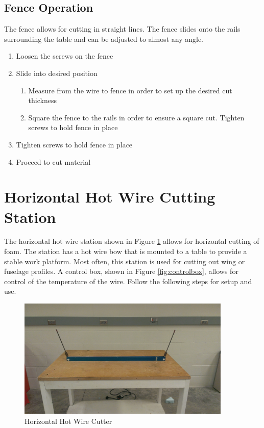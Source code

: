 
\subsection{Fence Operation}
The fence allows for cutting in straight lines. The fence slides onto the rails surrounding the table and can be adjusted to almost any angle.

\begin{enumerate}
\item Loosen the screws on the fence
\item Slide into desired position
\begin{enumerate}
\item Measure from the wire to fence in order to set up the desired cut thickness
\item Square the fence to the rails in order to ensure a square cut.
Tighten screws to hold fence in place
\end{enumerate}
\item Tighten screws to hold fence in place
\item Proceed to cut material
\end{enumerate}

\section{Horizontal Hot Wire Cutting Station}
The horizontal hot wire station shown in Figure \ref{fig:hortcutter} allows for horizontal cutting of foam. The station has a hot wire bow that is mounted to a table to provide a stable work platform. Most often, this station is used for cutting out wing or fuselage profiles.  A control box, shown in Figure \ref{fig:controlbox}, allows for control of the temperature of the wire.  Follow the following steps for setup and use.
\begin{figure}[ht]
\centering
\includegraphics[width=4in]{images/IMAG0208}
\caption{Horizontal Hot Wire Cutter}
\label{fig:hortcutter}
\end{figure}

